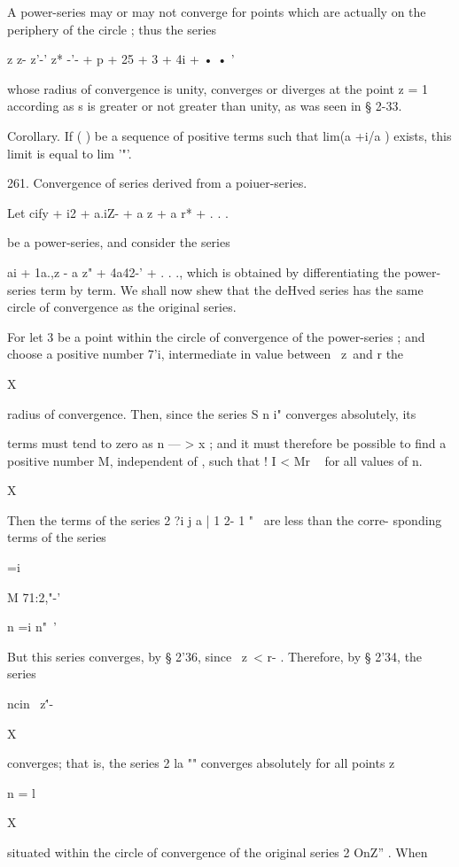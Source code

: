 A power-series may or may not converge for points which are actually on 
the periphery of the circle ; thus the series 

z z- z'-' z* 
-'- + p + 25 + 3  + 4i + • •  ' 

whose radius of convergence is unity, converges or diverges at the point z = 1 
according as s is greater or not greater than unity, as was seen in § 2-33. 

Corollary. If (  ) be a sequence of positive terms such that lim(a +i/a ) exists, this 
limit is equal to lim   '"'. 

261. Convergence of series derived from a poiuer-series. 

Let cify +  i2 + a.iZ- + a z  + a r* + . . . 

be a power-series, and consider the series 

ai + 1a.,z -   a z" + 4a42-' + . . ., 
which is obtained by differentiating the power-series term by term. We 
shall now shew that the deHved series has the same circle of convergence as the 
original series. 

For let 3 be a point within the circle of convergence of the power-series ; 
and choose a positive number 7'i, intermediate in value between \ z\ and r the 

X 

radius of convergence. Then, since the series S  n i" converges absolutely, its 

terms must tend to zero as n — > x ; and it must therefore be possible to find a 
positive number M, independent of  , such that !    I < Mr ~  for all values 
of n. 

 X 

Then the terms of the series 2 ?i j a  | 1 2- 1 "~  are less than the corre- 
sponding terms of the series 



 =i 



M   71:2,"-' 

n  =i n"~' 

But this series converges, by § 2'36, since \ z\ < r- . Therefore, by § 2'34, the 
series 

 ncin \ z\''-  

X 

converges; that is, the series 2  la ""  converges absolutely for all points z 

n = l 

X 

situated within the circle of convergence of the original series 2 OnZ'' . When 

